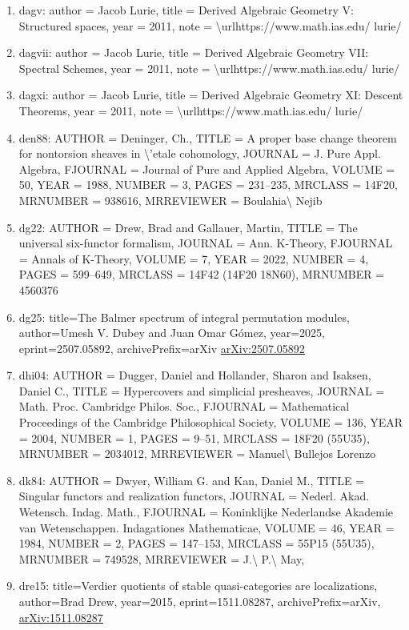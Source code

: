 \documentclass[11pt]{article}
\begin{document}
\begin{enumerate}[leftmargin=*]
  \item dagv: author = Jacob Lurie, title = Derived Algebraic Geometry V: Structured spaces, year = 2011, note = \textbackslash{}urlhttps://www.math.ias.edu/ lurie/
  \item dagvii: author = Jacob Lurie, title = Derived Algebraic Geometry VII: Spectral Schemes, year = 2011, note = \textbackslash{}urlhttps://www.math.ias.edu/ lurie/
  \item dagxi: author = Jacob Lurie, title = Derived Algebraic Geometry XI: Descent Theorems, year = 2011, note = \textbackslash{}urlhttps://www.math.ias.edu/ lurie/
  \item den88: AUTHOR = Deninger, Ch., TITLE = A proper base change theorem for nontorsion sheaves in \textbackslash{}'etale cohomology, JOURNAL = J. Pure Appl. Algebra, FJOURNAL = Journal of Pure and Applied Algebra, VOLUME = 50, YEAR = 1988, NUMBER = 3, PAGES = 231--235, MRCLASS = 14F20, MRNUMBER = 938616, MRREVIEWER = Boulahia\textbackslash{} Nejib
  \item dg22: AUTHOR = Drew, Brad and Gallauer, Martin, TITLE = The universal six-functor formalism, JOURNAL = Ann. K-Theory, FJOURNAL = Annals of K-Theory, VOLUME = 7, YEAR = 2022, NUMBER = 4, PAGES = 599--649, MRCLASS = 14F42 (14F20 18N60), MRNUMBER = 4560376
  \item dg25: title=The Balmer spectrum of integral permutation modules, author=Umesh V. Dubey and Juan Omar Gómez, year=2025, eprint=2507.05892, archivePrefix=arXiv \href{https://arxiv.org/abs/2507.05892}{arXiv:2507.05892}
  \item dhi04: AUTHOR = Dugger, Daniel and Hollander, Sharon and Isaksen, Daniel C., TITLE = Hypercovers and simplicial presheaves, JOURNAL = Math. Proc. Cambridge Philos. Soc., FJOURNAL = Mathematical Proceedings of the Cambridge Philosophical Society, VOLUME = 136, YEAR = 2004, NUMBER = 1, PAGES = 9--51, MRCLASS = 18F20 (55U35), MRNUMBER = 2034012, MRREVIEWER = Manuel\textbackslash{} Bullejos Lorenzo
  \item dk84: AUTHOR = Dwyer, William G. and Kan, Daniel M., TITLE = Singular functors and realization functors, JOURNAL = Nederl. Akad. Wetensch. Indag. Math., FJOURNAL = Koninklijke Nederlandse Akademie van Wetenschappen. Indagationes Mathematicae, VOLUME = 46, YEAR = 1984, NUMBER = 2, PAGES = 147--153, MRCLASS = 55P15 (55U35), MRNUMBER = 749528, MRREVIEWER = J.\textbackslash{} P.\textbackslash{} May,
  \item dre15: title=Verdier quotients of stable quasi-categories are localizations, author=Brad Drew, year=2015, eprint=1511.08287, archivePrefix=arXiv, \href{https://arxiv.org/abs/1511.08287}{arXiv:1511.08287}

\end{enumerate}
\end{document}
